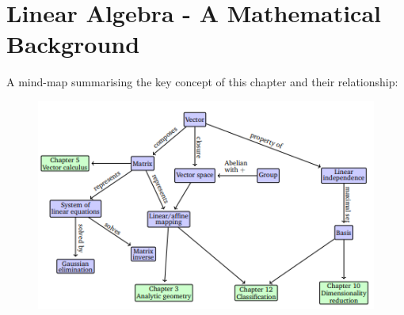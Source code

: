 \section*{Linear Algebra - A Mathematical Background}
A mind-map summarising the key concept of this chapter and their relationship:
\begin{figure}[htbp]
    \centering
    \includegraphics[width= 12cm]{Mathematical Background/mind-map.png}
\end{figure}

